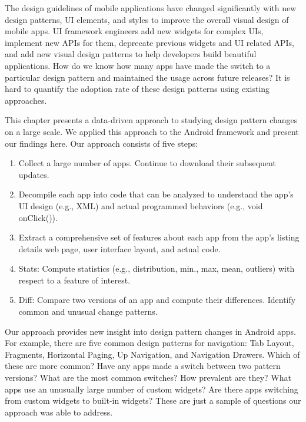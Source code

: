 \par The design guidelines of mobile applications have changed significantly with new design patterns, UI elements, and styles to improve the overall visual design of mobile apps. UI framework engineers add new widgets for complex UIs, implement new APIs for them, deprecate previous widgets and UI related APIs, and add new visual design patterns to help developers build beautiful applications. How do we know how many apps have made the switch to a particular design pattern and maintained the usage across future releases? 
It is hard to quantify the adoption rate of these design patterns using existing approaches.

\par This chapter presents a data-driven approach to studying design pattern changes on a large scale.
We applied this approach to the Android framework and present our findings here. 
Our approach consists of five steps:

\begin{enumerate}[itemsep=0ex,parsep=0ex]
	\item Collect a large number of apps. Continue to download their subsequent updates.
	\item Decompile each app into code that can be analyzed to understand the app's UI design (e.g., XML) and actual programmed behaviors (e.g., void onClick()).
	\item Extract a comprehensive set of features about each app from the app's listing details web page, user interface layout, and actual code.
	\item Stats: Compute statistics (e.g., distribution, min., max, mean, outliers) with respect to a feature of interest.
	\item Diff: Compare two versions of an app and compute their differences. Identify common and unusual change patterns.
\end{enumerate}

\par Our approach provides new insight into design pattern changes in Android apps.
For example, there are five common design patterns for navigation: Tab Layout, Fragments, Horizontal Paging, Up Navigation, and Navigation Drawers.
Which of these are more common?
Have any apps made a switch between two pattern versions?
What are the most common switches? How prevalent are they?
What apps use an unusually large number of custom widgets?
Are there apps switching from custom widgets to built-in widgets? These are just a sample of questions our approach was able to address.

